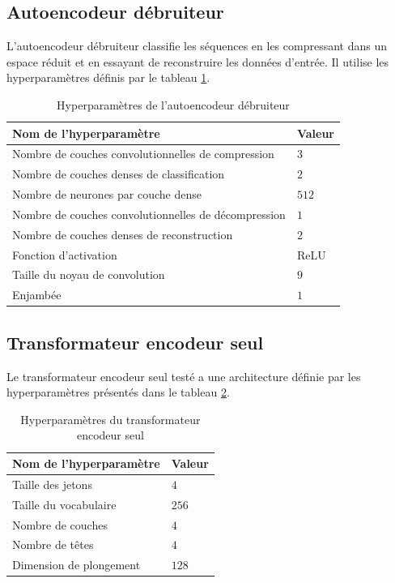 \subsection{Autoencodeur débruiteur}
L'autoencodeur débruiteur classifie les séquences en les compressant dans un espace réduit et en
essayant de reconstruire les données d'entrée. Il utilise les hyperparamètres définis par le tableau
\ref{tableau:dnae_hyperparametre}.

\begin{table}[hbt!]
    \centering
    \begin{tabular}{ll}
\hline
Nom de l'hyperparamètre & Valeur \\
\hline
Nombre de couches convolutionnelles de compression & $3$ \\
Nombre de couches denses de classification & $2$ \\
Nombre de neurones par couche dense & $512$ \\
Nombre de couches convolutionnelles de décompression & $1$ \\
Nombre de couches denses de reconstruction & $2$ \\
Fonction d'activation & ReLU \\
Taille du noyau de convolution & $9$ \\
Enjambée & $1$ \\
\hline
    \end{tabular}
    \caption{Hyperparamètres de l'autoencodeur débruiteur}
    \label{tableau:dnae_hyperparametre}
\end{table}

\subsection{Transformateur encodeur seul}
Le transformateur encodeur seul testé a une architecture définie par les hyperparamètres présentés
dans le tableau \ref{tableau:transformateur_hyperparametre}.

\begin{table}[hbt!]
    \centering
    \begin{tabular}{ll}
\hline
Nom de l'hyperparamètre & Valeur \\
\hline
Taille des jetons & $4$ \\
Taille du vocabulaire & $256$ \\
Nombre de couches & $4$ \\
Nombre de têtes & $4$ \\
Dimension de plongement & $128$ \\
\hline
    \end{tabular}
    \caption{Hyperparamètres du transformateur encodeur seul}
    \label{tableau:transformateur_hyperparametre}
\end{table}

